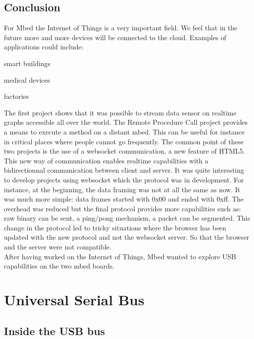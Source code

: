 \documentclass[pdftex,10pt,a4paper]{report}
\newenvironment{packed_item}{
\begin{itemize}
  \setlength{\itemsep}{1pt}
  \setlength{\parskip}{0pt}
  \setlength{\parsep}{0pt}
}{\end{itemize}}
\begin{document}
\section{Conclusion}
For Mbed the Internet of Things is a very important field. We feel that in the future more and more devices will be connected to the cloud. Examples of applications could include:
\begin{packed_item}
	\item smart buildings
	\item medical devices
	\item factories
\end{packed_item}

The first project shows that it was possible to stream data sensor on realtime graphs accessible all over the world. The Remote Procedure Call project provides a means to execute a method on a distant mbed. This can be useful for instance in critical places where people cannot go frequently. The common point of these two projects is the use of a websocket communication, a new feature of HTML5. This new way of communication enables realtime capabilities with a bidirectionnal communication between client and server. It was quite interesting to develop projects using websocket which the protocol was in development. For instance, at the beginning, the data framing was not at all the same as now. It was much more simple: data frames started with 0x00 and ended with 0xff. The overhead was reduced but the final protocol provides more capabilities such as: raw binary can be sent, a ping/pong mechanism, a packet can be segmented. This change in the protocol led to tricky situations where the browser has been updated with the new protocol and not the websocket server. So that the browser and the server were not compatible.\\



After having worked on the Internet of Things, Mbed wanted to explore USB capabilities on the two mbed boards.
	
	
	
	
	
	
	
	
	
	

\chapter{Universal Serial Bus}

\section{Inside the USB bus}
\end{document}
